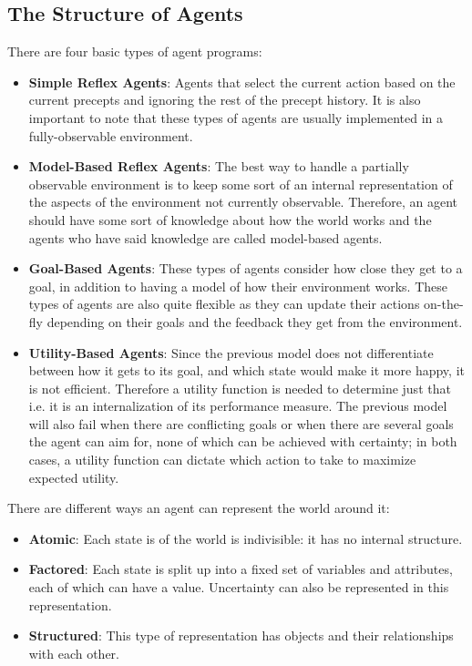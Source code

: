 \documentclass[twoside]{article}
\begin{document}
\subsection{The Structure of Agents}
There are four basic types of agent programs:
\begin{itemize}
        \item \textbf{Simple Reflex Agents}: Agents that select the current
        action based on the current precepts and ignoring the rest of the
        precept history. It is also important to note that these types of
        agents are usually implemented in a fully-observable environment.
        \item \textbf{Model-Based Reflex Agents}: The best way to handle a
        partially observable environment is to keep some sort of an internal
        representation of the aspects of the environment not currently
        observable. Therefore, an agent should have some sort of knowledge
        about how the world works and the agents who have said knowledge are
        called model-based agents.
        \item \textbf{Goal-Based Agents}: These types of agents consider how
        close they get to a goal, in addition to having a model of how their
        environment works. These types of agents are also quite flexible as
        they can update their actions on-the-fly depending on their goals and
        the feedback they get from the environment.
        \item \textbf{Utility-Based Agents}: Since the previous model does not
        differentiate between how it gets to its goal, and which state would
        make it more happy, it is not efficient. Therefore a utility function
        is needed to determine just that i.e. it is an internalization of its
        performance measure. The previous model will also fail when there are
        conflicting goals or when there are several goals the agent can aim
        for, none of which can be achieved with certainty; in both cases,
        a utility function can dictate which action to take to maximize
        expected utility.
\end{itemize}
There are different ways an agent can represent the world around it:
\begin{itemize}
        \item \textbf{Atomic}: Each state is of the world is indivisible: it
        has no internal structure.
        \item \textbf{Factored}: Each state is split up into a fixed set of
        variables and attributes, each of which can have a value. Uncertainty
        can also be represented in this representation.
        \item \textbf{Structured}: This type of representation has objects and
        their relationships with each other.
\end{itemize}
\end{document}
